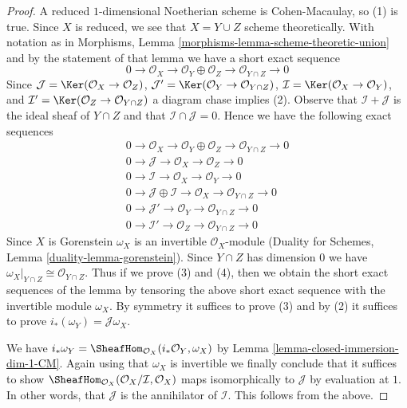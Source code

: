 \begin{proof}
A reduced $1$-dimensional Noetherian scheme is Cohen-Macaulay, so
(1) is true. Since $X$ is reduced, we see that $X = Y \cup Z$
scheme theoretically. With notation as in
Morphisms, Lemma \ref{morphisms-lemma-scheme-theoretic-union}
and by the statement of that lemma
we have a short exact sequence
$$
0 \to \mathcal{O}_X \to
\mathcal{O}_Y \oplus \mathcal{O}_Z \to \mathcal{O}_{Y \cap Z} \to 0
$$
Since $\mathcal{J} = \Ker(\mathcal{O}_X \to \mathcal{O}_Z)$,
$\mathcal{J}' = \Ker(\mathcal{O}_Y \to \mathcal{O}_{Y \cap Z})$,
$\mathcal{I} = \Ker(\mathcal{O}_X \to \mathcal{O}_Y)$, and
$\mathcal{I}' = \Ker(\mathcal{O}_Z \to \mathcal{O}_{Y \cap Z})$
a diagram chase implies (2).
Observe that $\mathcal{I} + \mathcal{J}$ is the ideal sheaf
of $Y \cap Z$ and that $\mathcal{I} \cap \mathcal{J} = 0$.
Hence we have the following exact sequences
\begin{align*}
0 \to \mathcal{O}_X \to \mathcal{O}_Y \oplus \mathcal{O}_Z \to
\mathcal{O}_{Y \cap Z} \to 0 \\
0 \to \mathcal{J} \to \mathcal{O}_X \to \mathcal{O}_Z \to 0 \\
0 \to \mathcal{I} \to \mathcal{O}_X \to \mathcal{O}_Y \to 0 \\
0 \to \mathcal{J} \oplus \mathcal{I} \to \mathcal{O}_X \to
\mathcal{O}_{Y \cap Z} \to 0 \\
0 \to \mathcal{J}' \to \mathcal{O}_Y \to \mathcal{O}_{Y \cap Z} \to 0 \\
0 \to \mathcal{I}' \to \mathcal{O}_Z \to \mathcal{O}_{Y \cap Z} \to 0
\end{align*}
Since $X$ is Gorenstein $\omega_X$ is an invertible $\mathcal{O}_X$-module
(Duality for Schemes, Lemma \ref{duality-lemma-gorenstein}).
Since $Y \cap Z$ has dimension $0$ we have
$\omega_X|_{Y \cap Z} \cong \mathcal{O}_{Y \cap Z}$.
Thus if we prove (3) and (4), then we obtain the short exact
sequences of the lemma by tensoring the above
short exact sequence with the invertible module $\omega_X$.
By symmetry it suffices to prove (3) and by
(2) it suffices to prove $i_*(\omega_Y) = \mathcal{J}\omega_X$.

\medskip\noindent
We have
$i_*\omega_Y = \SheafHom_{\mathcal{O}_X}(i_*\mathcal{O}_Y, \omega_X)$
by Lemma \ref{lemma-closed-immersion-dim-1-CM}.
Again using that $\omega_X$ is invertible
we finally conclude that it suffices to show
$\SheafHom_{\mathcal{O}_X}(\mathcal{O}_X/\mathcal{I}, \mathcal{O}_X)$
maps isomorphically to $\mathcal{J}$ by evaluation at $1$.
In other words, that $\mathcal{J}$ is the annihilator of
$\mathcal{I}$. This follows from the above.
\end{proof}







